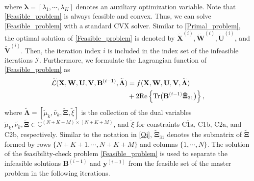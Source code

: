 \documentclass[12pt, draftclsnofoot, onecolumn]{IEEEtran}
\begin{document}
\begin{eqnarray}
\end{eqnarray}
where $\bm{\lambda}=[\lambda_1,\cdots,\lambda_K]$ denotes an auxiliary optimization variable. Note that \eqref{Feasible_problem} is always feasible and convex. Thus, we can solve \eqref{Feasible_problem} with a standard CVX solver. Similar to \eqref{Primal_problem}, the optimal solution of \eqref{Feasible_problem} is denoted by $\widetilde{\mathbf{X}}^{(i)},\widetilde{\mathbf{W}}^{(i)},\widetilde{\mathbf{U}}^{(i)}$, and $\widetilde{\mathbf{V}}^{(i)}$. Then, the iteration index $i$ is included in the index set of the infeasible iterations $\mathcal{I}$. Furthermore, we formulate the Lagrangian function of \eqref{Feasible_problem} as 
\begin{equation}\label{Largrangian_feasible}
\begin{aligned}
    \widetilde{\mathcal{L}}(\mathbf{X},\mathbf{W},\mathbf{U},\mathbf{V},\mathbf{B}^{(i-1)},\widetilde{\bm{\Lambda}})&={f}(\mathbf{X},\mathbf{W},\mathbf{U},\mathbf{V},\widetilde{\bm{\Lambda}})\\
    &+2\mathrm{Re}\left\{\mathrm{Tr}\big(\mathbf{B}^{(i-1)}\Tilde{\bm{\Xi}}_{31}\big)\right\},
\end{aligned}\vspace*{-2mm}
\end{equation}
where $\widetilde{\bm{\Lambda}}=[\widetilde{\mu}_k,\widetilde{\nu_k},\widetilde{\bm{\Xi}},\widetilde{\xi}]$ is the collection of the dual variables $\widetilde{\mu}_k,\widetilde{\nu_k},\widetilde{\bm{\Xi}}\in\mathbb{C}^{(N+K+M)\times (N+K+M)}$, and $\widetilde{\xi}$ for constraints $\overline{\mbox{C1a}}$, C1b, C2a, and C2b, respectively. Similar to the notation in \eqref{Qi}, $\widetilde{\bm{\Xi}}_{31}$ denotes the submatrix of $\widetilde{\bm{\Xi}}$ formed by rows $\{N+K+1,\cdots,N+K+M\}$ and columns $\{1,\cdots,N\}$. The solution of the feasibility-check problem \eqref{Feasible_problem} is used to separate the infeasible solutions $\mathbf{B}^{(i-1)}$ and $\mathbf{y}^{(i-1)}$ from the feasible set of the master problem in the following iterations.
\end{document}
